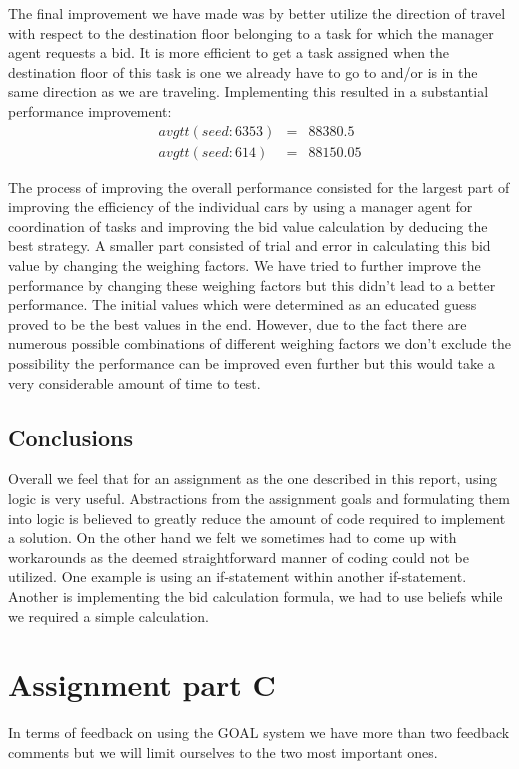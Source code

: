 \documentclass[a4paper,11pt]{article}
\begin{document}
The final improvement we have made was by better utilize the direction of travel with respect to the destination floor belonging to a task for which the manager agent requests a bid. It is more efficient to get a task assigned when the destination floor of this task is one we already have to go to and/or is in the same direction as we are traveling. Implementing this resulted in a substantial performance improvement:
\[\begin{array}{lcl}
avgtt (seed: 6353) & = & 88380.5\\
avgtt (seed: 614) & = & 88150.05
\end{array}\]

The process of improving the overall performance consisted for the largest part of improving the efficiency of the individual cars by using a manager agent for coordination of tasks and improving the bid value calculation by deducing the best strategy. A smaller part consisted of trial and error in calculating this bid value by changing the weighing factors. We have tried to further improve the performance by changing these weighing factors but this didn't lead to a better performance. The initial values which were determined as an educated guess proved to be the best values in the end. However, due to the fact there are numerous possible combinations of different weighing factors we don't exclude the possibility the performance can be improved even further but this would take a very considerable amount of time to test. 

\subsection{Conclusions}
Overall we feel that for an assignment as the one described in this report, using logic is very useful. Abstractions from the assignment goals and formulating them into logic is believed to greatly reduce the amount of code required to implement a solution. On the other hand we felt we sometimes had to come up with workarounds as the deemed straightforward manner of coding could not be utilized. One example is using an if-statement within another if-statement. Another is implementing the bid calculation formula, we had to use beliefs while we required a simple calculation. 

\section{Assignment part C}
In terms of feedback on using the GOAL system we have more than two feedback comments but we will limit ourselves to the two most important ones. 
\end{document}
